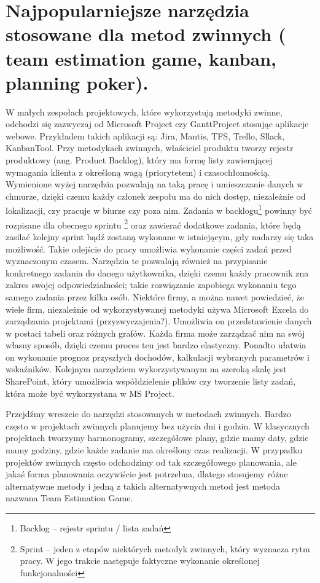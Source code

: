 \newpage

\section{Najpopularniejsze narzędzia stosowane dla metod zwinnych ( team estimation game, kanban, planning poker).}

W małych zespołach projektowych, które wykorzystują metodyki zwinne, odchodzi się zazwyczaj od Microsoft Project czy GanttProject stosując aplikacje webowe. Przykładem takich aplikacji są: Jira, Mantis, TFS, Trello, Sllack, KanbanTool. 
Przy metodykach zwinnych, właściciel produktu tworzy rejestr produktowy (ang. Product Backlog), który ma formę listy zawierającej wymagania klienta z określoną wagą  (priorytetem) i czasochłonnością.\cite{Shwaber_2004} Wymienione wyżej narzędzia pozwalają na taką pracę i umieszczanie danych w chmurze, dzięki czemu każdy członek zespołu ma do nich dostęp, niezależnie od lokalizacji, czy pracuje w biurze czy poza nim. Zadania w backlogu\footnote{Backlog – rejestr sprintu / lista zadań\cite{metody_zwinne_2016}} powinny być rozpisane dla obecnego sprintu \footnote{Sprint – jeden z etapów niektórych metodyk zwinnych, który wyznacza rytm pracy. W jego
trakcie następuje faktyczne wykonanie określonej funkcjonalności\cite{Samoorganizacja_2010}} oraz zawierać dodatkowe zadania, które będą zasilać kolejny sprint bądź zostaną wykonane w istniejącym, gdy nadarzy się taka możliwość. Takie odejście do pracy umożliwia wykonanie części zadań przed wyznaczonym czasem. Narzędzia te pozwalają również na przypisanie konkretnego zadania do danego użytkownika, dzięki czemu każdy pracownik zna zakres swojej odpowiedzialności; takie rozwiązanie zapobiega wykonaniu tego samego zadania przez kilka osób.
Niektóre firmy, a można nawet powiedzieć, że wiele firm, niezależnie od wykorzystywanej metodyki używa Microsoft Excela do zarządzania projektami (przyzwyczajenia?). Umożliwia on przedstawienie danych w postaci tabeli oraz różnych grafów. Każda firma może zarządzać nim na swój własny sposób, dzięki czemu proces ten jest bardzo elastyczny. Ponadto ułatwia on wykonanie prognoz przyszłych dochodów, kalkulacji wybranych parametrów i wskaźników. Kolejnym narzędziem wykorzystywanym na szeroką skalę jest SharePoint, który umożliwia współdzielenie plików czy tworzenie listy zadań, która może być wykorzystana w MS Project.

Przejdźmy wreszcie do narzędzi stosowanych w metodach zwinnych. Bardzo często w projektach zwinnych planujemy bez użycia dni i godzin. W klasycznych projektach tworzymy harmonogramy, szczegółowe plany, gdzie mamy daty, gdzie mamy godziny, gdzie każde zadanie ma określony czas realizacji. W przypadku projektów zwinnych często odchodzimy od tak szczegółowego planowania, ale jakaś forma planowania oczywiście jest potrzebna, dlatego stosujemy różne alternatywne metody i jedną z takich alternatywnych metod jest metoda nazwana Team Estimation Game.


